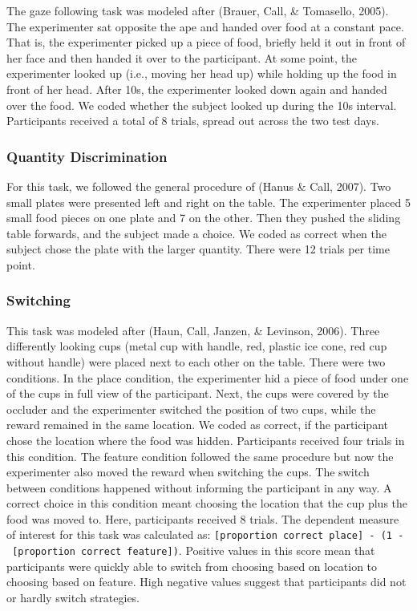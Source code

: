 \documentclass[10pt, letterpaper]{article}
\begin{document}
The gaze following task was modeled after (Brauer, Call, \& Tomasello,
2005). The experimenter sat opposite the ape and handed over food at a
constant pace. That is, the experimenter picked up a piece of food,
briefly held it out in front of her face and then handed it over to the
participant. At some point, the experimenter looked up (i.e., moving her
head up) while holding up the food in front of her head. After 10s, the
experimenter looked down again and handed over the food. We coded
whether the subject looked up during the 10s interval. Participants
received a total of 8 trials, spread out across the two test days.

\hypertarget{quantity-discrimination}{%
\subsubsection{Quantity Discrimination}\label{quantity-discrimination}}

For this task, we followed the general procedure of (Hanus \& Call,
2007). Two small plates were presented left and right on the table. The
experimenter placed 5 small food pieces on one plate and 7 on the other.
Then they pushed the sliding table forwards, and the subject made a
choice. We coded as correct when the subject chose the plate with the
larger quantity. There were 12 trials per time point.

\hypertarget{switching}{%
\subsubsection{Switching}\label{switching}}

This task was modeled after (Haun, Call, Janzen, \& Levinson, 2006).
Three differently looking cups (metal cup with handle, red, plastic ice
cone, red cup without handle) were placed next to each other on the
table. There were two conditions. In the place condition, the
experimenter hid a piece of food under one of the cups in full view of
the participant. Next, the cups were covered by the occluder and the
experimenter switched the position of two cups, while the reward
remained in the same location. We coded as correct, if the participant
chose the location where the food was hidden. Participants received four
trials in this condition. The feature condition followed the same
procedure but now the experimenter also moved the reward when switching
the cups. The switch between conditions happened without informing the
participant in any way. A correct choice in this condition meant
choosing the location that the cup plus the food was moved to. Here,
participants received 8 trials. The dependent measure of interest for
this task was calculated as:
\texttt{{[}proportion\ correct\ place{]}\ -\ (1\ -\ {[}proportion\ correct\ feature{]})}.
Positive values in this score mean that participants were quickly able
to switch from choosing based on location to choosing based on feature.
High negative values suggest that participants did not or hardly switch
strategies.
\end{document}
